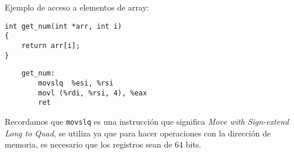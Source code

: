 \begin{ejemplo}
    Ejemplo de acceso a elementos de array:
    \begin{center}
        \begin{minipage}{0.45\textwidth}
            \begin{verbatim}
int get_num(int *arr, int i) 
{
    return arr[i];
}
        \end{verbatim}
        \end{minipage}
        \begin{minipage}{0.45\textwidth}
        \begin{verbatim}
    get_num:
        movslq  %esi, %rsi
        movl (%rdi, %rsi, 4), %eax
        ret
            \end{verbatim}
        \end{minipage}
    \end{center}
    Recordamos que \texttt{movslq} es una instrucción que significa \textit{Move with Sign-extend Long to Quad}, se utiliza ya que para hacer 
    operaciones con la dirección de memoria, es necesario que los registros sean de 64 bits.
\end{ejemplo}

